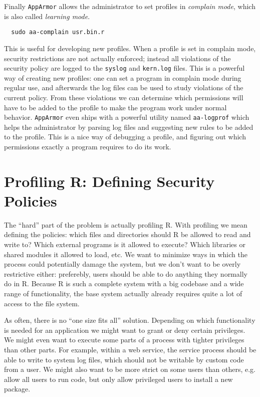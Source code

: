 \documentclass[article]{jss}
\newcommand{\R}{\textsf{R}\xspace}
\newcommand{\AppArmor}{\texttt{AppArmor}\xspace}
\begin{document}
Finally \AppArmor allows the administrator to set profiles in \emph{complain
mode}, which is also called \emph{learning mode}.
\begin{verbatim}
  sudo aa-complain usr.bin.r
\end{verbatim}
This is useful for developing new profiles. When a profile is set in complain
mode, security restrictions are not actually enforced; instead all violations
of the security policy are logged to the \texttt{syslog} and \texttt{kern.log}
files. This is a powerful way of creating new profiles: one can set a program in
complain mode during regular use, and afterwards the log files can be used to
study violations of the current policy. From these violations we can determine
which permissions will have to be added to the profile to make the program work
under normal behavior. \AppArmor even ships with a powerful utility named
\texttt{aa-logprof} which helps the administrator by parsing log files and
suggesting new rules to be added to the profile. This is a nice way of
debugging a profile, and figuring out which permissions exactly a program
requires to do its work.

\section[Profiling R]{Profiling \R: Defining Security Policies}

The ``hard'' part of the problem is actually profiling \R. With
profiling we mean defining the policies: which files and directories should
\R be allowed to read and write to? Which external programs is it
allowed to execute? Which libraries or shared modules it allowed to load, etc.
We want to minimize ways in which the process could potentially damage the
system, but we don't want to be overly restrictive either: preferebly, users
should be able to do anything they normally do in \R. Because \R is
such a complete system with a big codebase and a wide range of functionality,
the base system actually already requires quite a lot of access to the file
system.

As often, there is no ``one size fits all'' solution. Depending on which
functionality is needed for an application we might want to grant or deny
certain privileges. We might even want to execute some parts of a process with
tighter privileges than other parts. For example, within a web service, the
service process should be able to write to system log files, which should not be
writable by custom code from a user. We might also want to be more strict on
some users than others, e.g. allow all users to run code, but only allow
privileged users to install a new package.
\end{document}
